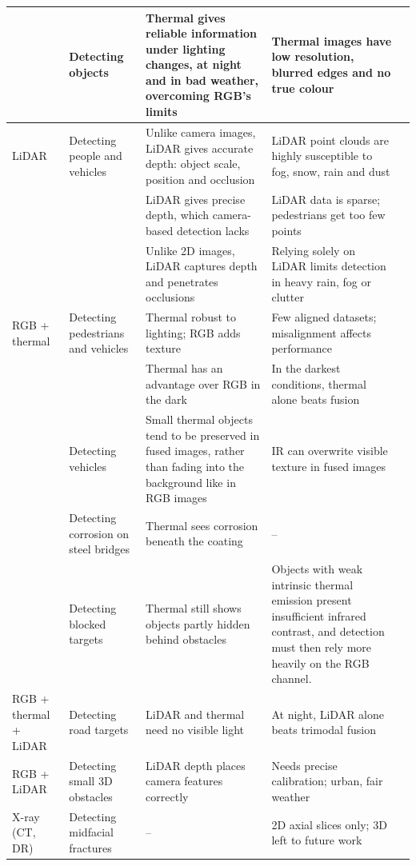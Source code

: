 {\begin{xltabular}{\textwidth}{>{\RaggedRight\arraybackslash}p{2.1cm}>{\RaggedRight\arraybackslash}p{2.9cm}>{\RaggedRight\arraybackslash}X>{\RaggedRight\arraybackslash}Xp{0.95cm}}
 & Detecting objects & Thermal gives reliable information under lighting changes, at night and in bad weather, overcoming RGB's limits & Thermal images have low resolution, blurred edges and no true colour & \citep{Wen2025} \\
\midrule
LiDAR & Detecting people and vehicles & Unlike camera images, LiDAR gives accurate depth: object scale, position and occlusion & LiDAR point clouds are highly susceptible to fog, snow, rain and dust & \citep{Naich2024} \\
 &  & LiDAR gives precise depth, which camera-based detection lacks & LiDAR data is sparse; pedestrians get too few points & \citep{Prasanth2026} \\
 &  & Unlike 2D images, LiDAR captures depth and penetrates occlusions & Relying solely on LiDAR limits detection in heavy rain, fog or clutter & \citep{Soumya2026} \\
\midrule
RGB + thermal & Detecting pedestrians and vehicles & Thermal robust to lighting; RGB adds texture & Few aligned datasets; misalignment affects performance & \citep{Hou2024} \\
 &  & Thermal has an advantage over RGB in the dark & In the darkest conditions, thermal alone beats fusion & \citep{Jiang2024} \\
 & Detecting vehicles & Small thermal objects tend to be preserved in fused images, rather than fading into the background like in RGB images & IR can overwrite visible texture in fused images & \citep{Chang2024} \\
 & Detecting corrosion on steel bridges & Thermal sees corrosion beneath the coating & -- & \citep{Lim2021} \\
 & Detecting blocked targets & Thermal still shows objects partly hidden behind obstacles & Objects with weak intrinsic thermal emission present insufficient infrared contrast, and detection must then rely more heavily on the RGB channel. & \citep{Wang2026b} \\
\midrule
RGB + thermal + LiDAR & Detecting road targets & LiDAR and thermal need no visible light & At night, LiDAR alone beats trimodal fusion & \citep{Tran2025} \\
\midrule
RGB + LiDAR & Detecting small 3D obstacles & LiDAR depth places camera features correctly & Needs precise calibration; urban, fair weather & \citep{Cheng2025} \\
\midrule
X-ray (CT, DR) & Detecting midfacial fractures & -- & 2D axial slices only; 3D left to future work & \citep{Morita2024} \\

\end{xltabular}}
